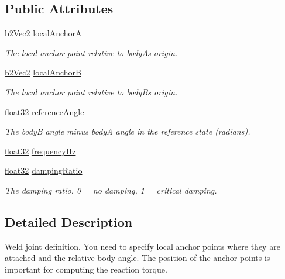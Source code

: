 \subsection*{Public Attributes}
\begin{DoxyCompactItemize}
\item 
\mbox{\hyperlink{structb2_vec2}{b2\+Vec2}} \mbox{\hyperlink{structb2_weld_joint_def_a3b04af6164bb32efc3f5cf3e8d2b7109}{local\+AnchorA}}
\begin{DoxyCompactList}\small\item\em The local anchor point relative to bodyA\textquotesingle{}s origin. \end{DoxyCompactList}\item 
\mbox{\hyperlink{structb2_vec2}{b2\+Vec2}} \mbox{\hyperlink{structb2_weld_joint_def_a528262b92dac10de37411ad8c5637149}{local\+AnchorB}}
\begin{DoxyCompactList}\small\item\em The local anchor point relative to bodyB\textquotesingle{}s origin. \end{DoxyCompactList}\item 
\mbox{\hyperlink{b2_settings_8h_aacdc525d6f7bddb3ae95d5c311bd06a1}{float32}} \mbox{\hyperlink{structb2_weld_joint_def_a31aeb208f15842091c55e3f1bab6d8f1}{reference\+Angle}}
\begin{DoxyCompactList}\small\item\em The bodyB angle minus bodyA angle in the reference state (radians). \end{DoxyCompactList}\item 
\mbox{\hyperlink{b2_settings_8h_aacdc525d6f7bddb3ae95d5c311bd06a1}{float32}} \mbox{\hyperlink{structb2_weld_joint_def_abf42ce852914af845e9203b341f55c87}{frequency\+Hz}}
\item 
\mbox{\hyperlink{b2_settings_8h_aacdc525d6f7bddb3ae95d5c311bd06a1}{float32}} \mbox{\hyperlink{structb2_weld_joint_def_ace1f0131610f14558f3dbaaed7b10e24}{damping\+Ratio}}
\begin{DoxyCompactList}\small\item\em The damping ratio. 0 = no damping, 1 = critical damping. \end{DoxyCompactList}\end{DoxyCompactItemize}


\subsection{Detailed Description}
Weld joint definition. You need to specify local anchor points where they are attached and the relative body angle. The position of the anchor points is important for computing the reaction torque. 

